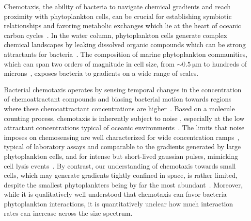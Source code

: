 \documentclass[9pt,twocolumn,twoside]{pnas-new}
\begin{document}

Chemotaxis, the ability of bacteria to navigate chemical gradients and reach proximity with phytoplankton cells, can be crucial for establishing symbiotic relationships and favoring metabolic exchanges which lie at the heart of oceanic carbon cycles~\cite{azam1998microbial,raina2019role,raina2022chemotaxis}.
In the water column, phytoplankton cells generate complex chemical landscapes by leaking dissolved organic compounds which can be strong attractants for bacteria~\cite{thornton2014dissolved,smriga2016chemotaxis,seymour2017zooming}.
The composition of marine phytoplankton communities, which can span two orders of magnitude in cell size, from $\sim\SI{0.5}{\micro\m}$ to hundreds of microns~\cite{sieburth1978pelagic}, exposes bacteria to gradients on a wide range of scales.

Bacterial chemotaxis operates by sensing temporal changes in the concentration of chemoattractant compounds and biasing bacterial motion towards regions where these chemoattractant concentrations are higher~\cite{macnab1972gradientsensing,brown1974temporal}. Based on a molecule counting process, chemotaxis is inherently subject to noise \cite{berg1977physics,tenwolde2016fundamental}, especially at the low attractant concentrations typical of oceanic environments~\cite{lee1975amino}.
The limits that noise imposes on chemosensing are well characterized for wide concentration ramps~\cite{mora2010limits}, typical of laboratory assays and comparable to the gradients generated by large phytoplankton cells, and for intense but short-lived gaussian pulses, mimicking cell lysis events~\cite{hein2016physical,brumley2019bacteria}.
By contrast, our understanding of chemotaxis towards small cells, which may generate gradients tightly confined in space, is rather limited, despite the smallest phytoplankters being by far the most abundant~\cite{sprules1986plankton,cermeno2008species}. Moreover, while it is qualitatively well understood that chemotaxis can favor bacteria-phytoplankton interactions, it is quantitatively unclear how much interaction rates can increase across the size spectrum.
\end{document}
